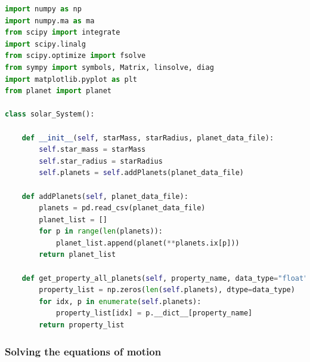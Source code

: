 \documentclass[11pt, oneside]{article}   	%
\begin{document}
\begin{lstlisting}[language=Python, caption={Object for storing the data}]
import numpy as np
import numpy.ma as ma
from scipy import integrate
import scipy.linalg
from scipy.optimize import fsolve
from sympy import symbols, Matrix, linsolve, diag
import matplotlib.pyplot as plt
from planet import planet

class solar_System():

    def __init__(self, starMass, starRadius, planet_data_file):
        self.star_mass = starMass
        self.star_radius = starRadius
        self.planets = self.addPlanets(planet_data_file)

    def addPlanets(self, planet_data_file):
        planets = pd.read_csv(planet_data_file)
        planet_list = []
        for p in range(len(planets)):
            planet_list.append(planet(**planets.ix[p]))
        return planet_list

    def get_property_all_planets(self, property_name, data_type="float"):
        property_list = np.zeros(len(self.planets), dtype=data_type)
        for idx, p in enumerate(self.planets):
            property_list[idx] = p.__dict__[property_name]
        return property_list
\end{lstlisting}

\subsubsection*{Solving the equations of motion}
\end{document}
